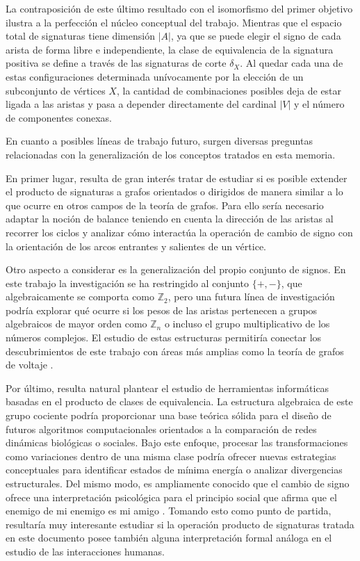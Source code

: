 \documentclass[11pt,a4paper,spanish]{report}
\theoremstyle{plain}
\begin{document}
La contraposición de este último resultado con el isomorfismo del primer objetivo ilustra a la perfección el núcleo conceptual del trabajo. Mientras que el espacio total de signaturas tiene dimensión $|A|$, ya que se puede elegir el signo de cada arista de forma libre e independiente, la clase de equivalencia de la signatura positiva se define a través de las signaturas de corte $\delta_X$. Al quedar cada una de estas configuraciones determinada unívocamente por la elección de un subconjunto de vértices $X$, la cantidad de combinaciones posibles deja de estar ligada a las aristas y pasa a depender directamente del cardinal $|V|$ y el número de componentes conexas. 

En cuanto a posibles líneas de trabajo futuro, surgen diversas preguntas relacionadas con la generalización de los conceptos tratados en esta memoria.

En primer lugar, resulta de gran interés tratar de estudiar si es posible extender el producto de signaturas a grafos orientados o dirigidos de manera similar a lo que ocurre en otros campos de la teoría de grafos. Para ello sería necesario adaptar la noción de balance teniendo en cuenta la dirección de las aristas al recorrer los ciclos y analizar cómo interactúa la operación de cambio de signo con la orientación de los arcos entrantes y salientes de un vértice.

Otro aspecto a considerar es la generalización del propio conjunto de signos. En este trabajo la investigación se ha restringido al conjunto $\{+, -\}$, que algebraicamente se comporta como $\mathbb{Z}_2$, pero una futura línea de investigación podría explorar qué ocurre si los pesos de las aristas pertenecen a grupos algebraicos de mayor orden como $\mathbb{Z}_n$ o incluso el grupo multiplicativo de los números complejos. El estudio de estas estructuras permitiría conectar los descubrimientos de este trabajo con áreas más amplias como la teoría de grafos de voltaje \cite{gross1974voltage}.

Por último, resulta natural plantear el estudio de herramientas informáticas basadas en el producto de clases de equivalencia. La estructura algebraica de este grupo cociente podría proporcionar una base teórica sólida para el diseño de futuros algoritmos computacionales orientados a la comparación de redes dinámicas biológicas o sociales. Bajo este enfoque, procesar las transformaciones como variaciones dentro de una misma clase podría ofrecer nuevas estrategias conceptuales para identificar estados de mínima energía o analizar divergencias estructurales. Del mismo modo, es ampliamente conocido que el cambio de signo ofrece una interpretación psicológica para el principio social que afirma que el enemigo de mi enemigo es mi amigo \cite{heider1946attitudes, cartwright1956structural}. Tomando esto como punto de partida, resultaría muy interesante estudiar si la operación producto de signaturas tratada en este documento posee también alguna interpretación formal análoga en el estudio de las interacciones humanas.
\end{document}
